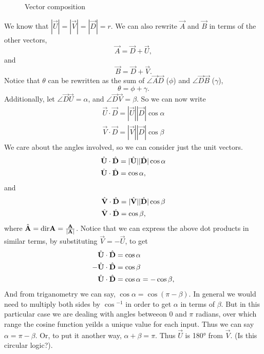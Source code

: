 \documentclass[main.tex]{subfiles}
\begin{document}
{\begin{figure}[h]
    \caption{Vector composition}
\end{figure}


We know that $|\vec{U}| = |\vec{V}| = |\vec{D}| = r$.
We can also rewrite $\vec{A}$ and $\vec{B}$ in terms of the other vectors,
\[\vec{A} = \vec{D} + \vec{U},\] and \[\vec{B} = \vec{D} + \vec{V}.\]
%
Notice that $\theta$ can be rewritten as the sum of 
$\angle{\vec{A}\vec{D}}$ ($\phi$) and $\angle{\vec{D}\vec{B}}$ ($\gamma$),
\[\theta = \phi + \gamma.\] Additionally, let $\angle{\vec{D}\vec{U}} = \alpha$,
and $\angle{\vec{D}\vec{V}} = \beta$. So we can now
write
%
\begin{align*}
\vec{U}\cdot\vec{D} = |\vec{U}||\vec{D}|\cos{\alpha}\\
\vec{V}\cdot\vec{D} = |\vec{V}||\vec{D}|\cos{\beta}
\end{align*}
%
We care about the angles involved, so we can consider just the unit vectors.
%
\begin{align*}
\hat{\mathbf{U}}\cdot\hat{\mathbf{D}} &= |\hat{\mathbf{U}}||\hat{\mathbf{D}}|\cos{\alpha}\\
\hat{\mathbf{U}}\cdot\hat{\mathbf{D}} &= \cos{\alpha},
\end{align*}
and
\begin{align*}
\hat{\mathbf{V}}\cdot\hat{\mathbf{D}} &= |\hat{\mathbf{V}}||\hat{\mathbf{D}}|\cos{\beta}\\
\hat{\mathbf{V}}\cdot\hat{\mathbf{D}} &= \cos{\beta},
\end{align*}
%
where $\hat{\mathbf{A}} = \text{dir}\mathbf{A} =\frac{\mathbf{A}}{|\mathbf{A}|}$. 
Notice that we can express the above dot products in similar terms,
by substituting $\vec{V} = -\vec{U}$, to get
%
\begin{align*}
\hat{\mathbf{U}}\cdot\hat{\mathbf{D}} &= \cos{\alpha}\\
-\hat{\mathbf{U}}\cdot\hat{\mathbf{D}} &= \cos{\beta}\\
\hat{\mathbf{U}}\cdot\hat{\mathbf{D}} &= \cos{\alpha} = -\cos{\beta},
\end{align*}
%
And from triganometry we can say, $\cos{\alpha} = \cos{(\pi-\beta)}$.
In general we would need to multiply both sides by $\cos{}^{-1}$ in order to get
$\alpha$ in terms of $\beta$. But in this particular case we are dealing with
angles betweeon $0$ and $\pi$ radians, over which range the cosine function 
yeilds a unique value for each input. Thus we can say $\alpha = \pi-\beta$.
Or, to put it another way, $\alpha + \beta = \pi$. Thus $\vec{U}$ is \ang{180}
from $\vec{V}$. (Is this circular logic?).


}
\end{document}
